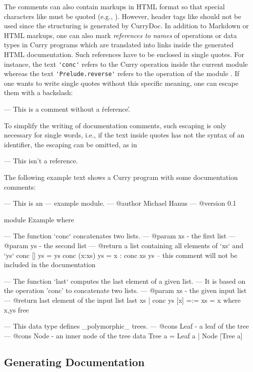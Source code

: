 The comments can also contain markups in HTML format
so that special characters like \ccode{<}
must be quoted (e.g., ).
However, header tags like  should not be used
since the structuring is generated by CurryDoc.
In addition to Markdown or HTML markups,
one can also mark \emph{references to names} of operations or data types
in Curry programs which are translated into links inside
the generated HTML documentation. Such references have to be
enclosed in single quotes. For instance, the text
\verb!'conc'! refers to the Curry operation 
inside the current module whereas the text
\verb!'Prelude.reverse'! refers to the operation 
of the module .
If one wants to write single quotes without this specific
meaning, one can escape them with a backslash:
\begin{curry}
--- This is a comment without a \'reference\'.
\end{curry}
To simplify the writing of documentation comments,
such escaping is only necessary for single words,
i.e., if the text inside quotes has not the syntax of
an identifier, the escaping can be omitted, as in
\begin{curry}
--- This isn't a reference.
\end{curry}
%
The following example text shows a Curry program with some
documentation comments:
\begin{curry}
--- This is an
--- example module.
--- @author Michael Hanus
--- @version 0.1

module Example where

--- The function `conc` concatenates two lists.
--- @param xs - the first list
--- @param ys - the second list
--- @return a list containing all elements of `xs` and `ys`
conc []     ys = ys
conc (x:xs) ys = x : conc xs ys
-- this comment will not be included in the documentation

--- The function `last` computes the last element of a given list.
--- It is based on the operation 'conc' to concatenate two lists.
--- @param xs - the given input list
--- @return last element of the input list
last xs | conc ys [x] =:= xs  = x   where x,ys free

--- This data type defines _polymorphic_ trees.
--- @cons Leaf - a leaf of the tree
--- @cons Node - an inner node of the tree
data Tree a = Leaf a | Node [Tree a]
\end{curry}

\subsection{Generating Documentation}

